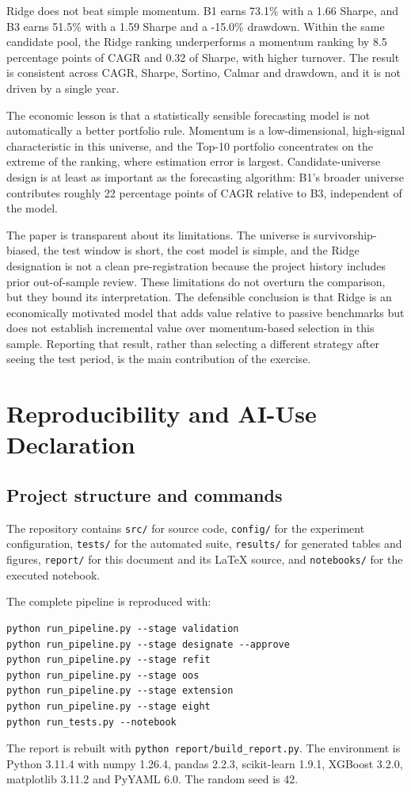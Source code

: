 \documentclass[11pt,a4paper]{article}
\begin{document}
Ridge does not beat simple momentum. B1 earns 73.1\% with a 1.66 Sharpe, and B3 earns 51.5\% with a 1.59 Sharpe and a -15.0\% drawdown. Within the same candidate pool, the Ridge ranking underperforms a momentum ranking by 8.5 percentage points of CAGR and 0.32 of Sharpe, with higher turnover. The result is consistent across CAGR, Sharpe, Sortino, Calmar and drawdown, and it is not driven by a single year.

The economic lesson is that a statistically sensible forecasting model is not automatically a better portfolio rule. Momentum is a low-dimensional, high-signal characteristic in this universe, and the Top-10 portfolio concentrates on the extreme of the ranking, where estimation error is largest. Candidate-universe design is at least as important as the forecasting algorithm: B1's broader universe contributes roughly 22 percentage points of CAGR relative to B3, independent of the model.

The paper is transparent about its limitations. The universe is survivorship-biased, the test window is short, the cost model is simple, and the Ridge designation is not a clean pre-registration because the project history includes prior out-of-sample review. These limitations do not overturn the comparison, but they bound its interpretation. The defensible conclusion is that Ridge is an economically motivated model that adds value relative to passive benchmarks but does not establish incremental value over momentum-based selection in this sample. Reporting that result, rather than selecting a different strategy after seeing the test period, is the main contribution of the exercise.


\section{Reproducibility and AI-Use Declaration}
\label{sec:reproducibility}

\subsection{Project structure and commands}

The repository contains \texttt{src/} for source code, \texttt{config/} for the experiment configuration, \texttt{tests/} for the automated suite, \texttt{results/} for generated tables and figures, \texttt{report/} for this document and its LaTeX source, and \texttt{notebooks/} for the executed notebook.

The complete pipeline is reproduced with:
\begin{verbatim}
python run_pipeline.py --stage validation
python run_pipeline.py --stage designate --approve
python run_pipeline.py --stage refit
python run_pipeline.py --stage oos
python run_pipeline.py --stage extension
python run_pipeline.py --stage eight
python run_tests.py --notebook
\end{verbatim}
The report is rebuilt with \texttt{python report/build\_report.py}. The environment is Python 3.11.4 with numpy 1.26.4, pandas 2.2.3, scikit-learn 1.9.1, XGBoost 3.2.0, matplotlib 3.11.2 and PyYAML 6.0. The random seed is 42.
\end{document}
